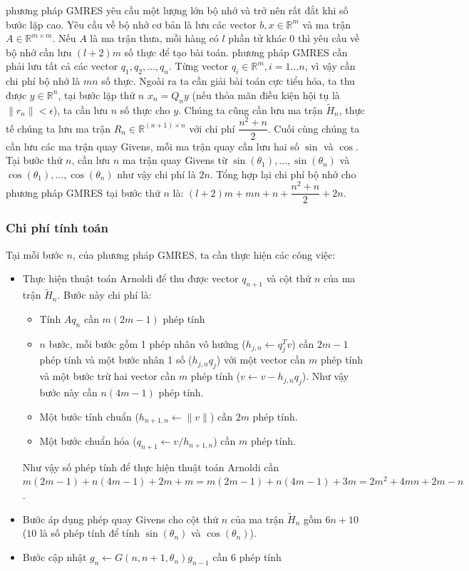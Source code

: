 \documentclass[14pt, a4paper]{article}
\numberwithin{equation}{section}
\numberwithin{algorithm}{section}
\numberwithin{figure}{section}
\numberwithin{dl}{section}
\numberwithin{md}{section}
\numberwithin{bd}{section}
\numberwithin{dn}{section}
\numberwithin{hq}{section}
\begin{document}
phương pháp GMRES yêu cầu một lượng lớn bộ nhớ và trở nên rất đắt khi số bước lặp cao.
Yêu cầu về bộ nhớ cơ bản là lưu các vector $b, x \in \mathbb{R}^{m}$ và ma trận $A \in \mathbb{R}^{m \times m}$. Nếu $A$ là ma trận thưa, mỗi hàng có $l$ phần tử khác 0 thì yêu cầu về bộ nhớ cần lưu $(l+2)m$ số thực để tạo bài toán. phương pháp GMRES cần phải lưu tất cả các vector $q_1, q_2, \dots, q_n$. Từng vector $q_i \in \mathbb{R}^{m}, i=1\dots n$, vì vậy cần chi phí bộ nhớ là $mn$ số thực.
Ngoài ra ta cần giải bài toán cực tiểu hóa, ta thu được $y \in \mathbb{R}^n$, tại bước lặp thứ $n$ $x_n = Q_n y$ (nếu thỏa mãn điều kiện hội tụ là $\lVert r_n \rVert < \epsilon$), ta cần lưu $n$ số thực cho $y$.
Chúng ta cũng cần lưu ma trận $\widetilde{H}_n$, thực tế chúng ta lưu ma trận $R_n \in \mathbb{R}^{(n+1) \times n}$ với chi phí $\dfrac{n^2 + n}{2}$.
Cuối cùng chúng ta cần lưu các ma trận quay Givens, mỗi ma trận quay cần lưu hai số $\sin$ và $\cos$. Tại bước thứ $n$, cần lưu $n$ ma trận quay Givens từ $\sin(\theta_1),\dots, \sin(\theta_n)$ và $\cos(\theta_1),\dots,\cos(\theta_n)$ như vậy chi phí là $2n$.
Tổng hợp lại chi phí bộ nhớ cho phương pháp GMRES tại bước thứ $n$ là: $(l+2)m + mn + n + \dfrac{n^2 + n}{2} + 2n$.

\subsubsection{Chi phí tính toán} \label{GMRES-Computation-Cost}

Tại mỗi bước $n$, của phương pháp GMRES, ta cần thực hiện các công việc:

\begin{itemize}
    \item Thực hiện thuật toán Arnoldi để thu được vector $q_{n+1}$ và cột thứ $n$ của ma trận $\widetilde{H}_n$. Bước này chi phí là: \begin{itemize}
        \item Tính $Aq_n$ cần $m(2m-1)$ phép tính
        \item $n$ bước, mỗi bước gồm 1 phép nhân vô hướng ($h_{j,n} \leftarrow q_j^Tv$) cần $2m-1$ phép tính và một bước nhân 1 số ($h_{j,n}q_j$) với một vector cần $m$ phép tính và một bước trừ hai vector cần $m$ phép tính ($v \leftarrow v - h_{j,n}q_j$). Như vậy bước này cần $n(4m-1)$ phép tính.
        \item Một bước tính chuẩn ($h_{n+1,n} \leftarrow \lVert v \rVert$) cần $2m$ phép tính.
        \item Một bước chuẩn hóa ($q_{n+1} \leftarrow v/h_{n+1,n}$) cần $m$ phép tính.
    \end{itemize}
    Như vậy số phép tính để thực hiện thuật toán Arnoldi cần $m(2m-1) + n(4m-1) + 2m + m=m(2m-1) + n(4m-1)+ 3m=2m^2+4mn+2m-n$.
    \item Bước áp dụng phép quay Givens cho cột thứ $n$ của ma trận $\widetilde{H}_n$ gồm $6n+10$ ($10$ là số phép tính để tính $\sin(\theta_n)$ và $\cos(\theta_n)$).
    \item Bước cập nhật $g_n \leftarrow G(n, n+1, \theta_n)g_{n-1}$ cần 6 phép tính
\end{itemize}
\end{document}
